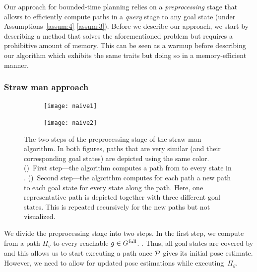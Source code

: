 \documentclass[a4paper,10pt]{article}
\begin{document}


Our approach for bounded-time planning relies on a \emph{preprocessing} stage that allows to efficiently compute paths in a \emph{query} stage to any goal state (under Assumptions~\ref{assum:4}-\ref{assum:3}). 
%
Before we describe our approach, we start by describing a \naive method that solves the aforementioned problem but requires a prohibitive amount of memory.
%
This can be seen as a warmup before describing our algorithm which exhibits the same traits but doing so in a memory-efficient manner.

\subsubsection{Straw man approach}
\label{subsec:strawman}
\begin{figure}[t]
    \centering
    \begin{subfigure}{.49\textwidth}
        \texttt{[image: naive1]}
        \caption{}
        \label{fig:naive1}
    \end{subfigure}
    \hfill
    \begin{subfigure}{0.49\textwidth}
        \texttt{[image: naive2]}
        \caption{}
        \label{fig:naive2}
    \end{subfigure}
    \caption{
    \CaptionTextSize
    The two steps of the preprocessing stage of the straw man algorithm. In both figures, paths that are very similar (and their corresponding goal states) are depicted using the same color.
    ()~First step---the algorithm computes a path from \Shome to every state in \Gfull.
    ()~Second step---the algorithm computes for each path a new path to each goal state for every state along the path. Here, one representative path is depicted together with three different goal states. 
    This is repeated recursively for the new paths but not visualized.}
    \label{fig:naive}
    \vspace{-5mm}
\end{figure}

We divide the preprocessing stage into two steps.
In the first step, we compute from \Shome a path $\Pi_g$ to every reachable $g \in G^{\textrm{full}}$. 
. Thus, all goal states are covered by \Shome and this allows us to start executing a path once $\mathcal{P}$ gives its initial pose estimate.
However, we need to allow for updated pose estimations while executing~$\Pi_g$. 
\end{document}

